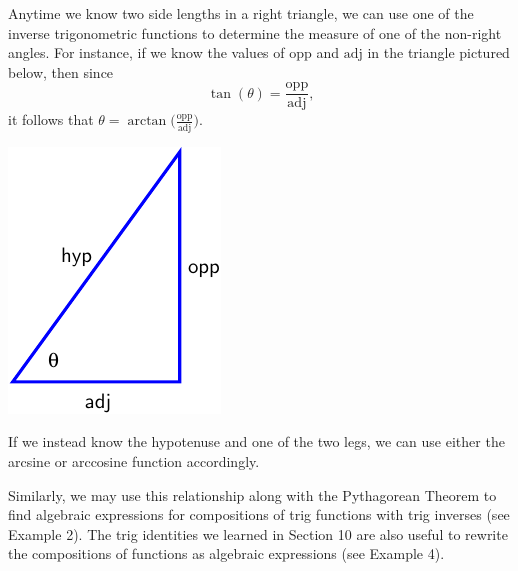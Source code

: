 \documentclass{ximera}
\begin{document}
\begin{summary}
Anytime we know two side lengths in a right triangle, we can use one of the inverse trigonometric functions to determine the measure of one of the non-right angles.  For instance, if we know the values of $\text{opp}$ and $\text{adj}$ in the triangle pictured below, then since%
\begin{equation*}
\tan(\theta) = \frac{\text{opp}}{\text{adj}}\text{,}
\end{equation*}
it follows that $\theta = \arctan\!\bigg(\frac{\text{opp}}{\text{adj}}\bigg)$.%
%
\begin{image}
\includegraphics[width=.5\linewidth]{right-triangle-SOH-CAH-TOA.pdf}
\end{image}
%
\par
%
If we instead know the hypotenuse and one of the two legs, we can use either the arcsine or arccosine function accordingly.%

Similarly, we may use this relationship along with the Pythagorean Theorem to find algebraic expressions for compositions of trig functions with trig inverses (see Example 2). The trig identities we learned in Section 10 are also useful to rewrite the compositions of functions as algebraic expressions (see Example 4). 
%

\end{summary}
\end{document}
